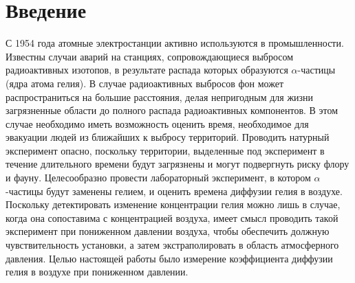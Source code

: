 \section{Введение}

С 1954 года атомные электростанции активно используются в промышленности. Известны случаи аварий на станциях, сопровождающиеся выбросом радиоактивных изотопов, в результате распада которых образуются $\alpha$-частицы (ядра атома гелия). В случае радиоактивных выбросов фон может распространиться на большие расстояния, делая непригодным для жизни загрязненные области до полного распада радиоактивных компонентов. В этом случае необходимо иметь возможность оценить время, необходимое для эвакуации людей из ближайших к выбросу территорий. Проводить натурный эксперимент опасно, поскольку территории, выделенные под эксперимент в течение длительного времени будут загрязнены и могут подвергнуть риску флору и фауну. Целесообразно провести лабораторный эксперимент, в котором $\alpha$-частицы будут заменены гелием, и оценить времена диффузии гелия в воздухе. Поскольку детектировать изменение концентрации гелия можно лишь в случае, когда она сопоставима с концентрацией воздуха, имеет смысл проводить такой эксперимент при пониженном давлении воздуха, чтобы обеспечить должную чувствительность установки, а затем экстраполировать в область атмосферного давления. Целью настоящей работы было измерение коэффициента диффузии гелия в воздухе при пониженном давлении. 
